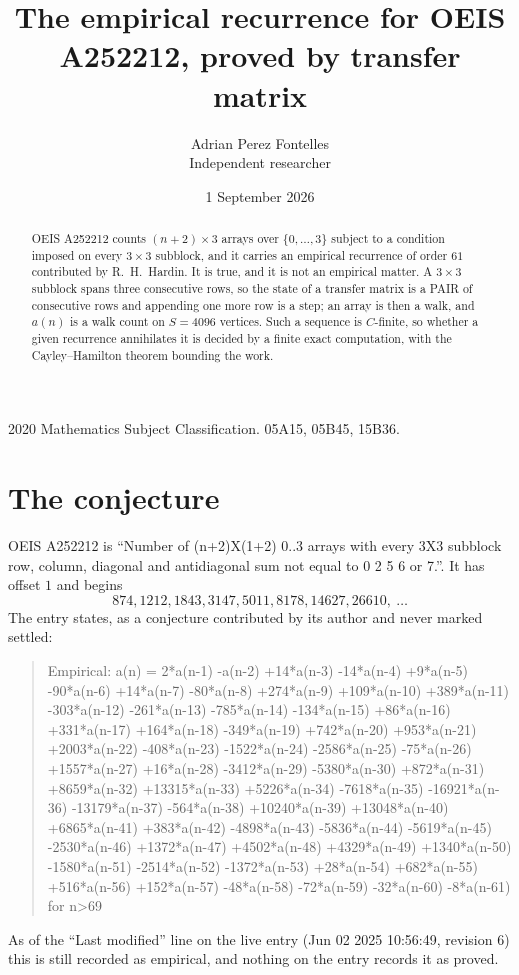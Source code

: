 \documentclass[11pt,a4paper]{article}
\title{The empirical recurrence for OEIS A252212, proved by transfer matrix}
\author{Adrian Perez Fontelles\\ \small Independent researcher}
\date{1 September 2026}
\theoremstyle{plain}
\theoremstyle{definition}
\begin{document}
\maketitle

\begin{abstract}
OEIS A252212 counts $(n+2)\times3$ arrays over $\{0,\dots,3\}$ subject to a condition imposed on
every $3\times3$ subblock, and it carries an empirical recurrence of order $61$
contributed by R.~H.~Hardin. It is true, and it is not an empirical matter. A $3\times3$
subblock spans three consecutive rows, so the state of a transfer matrix is a PAIR of
consecutive rows and appending one more row is a step; an array is then a walk, and
$a(n)$ is a walk count on $S=4096$ vertices. Such a sequence is $C$-finite, so whether a given
recurrence annihilates it is decided by a finite exact computation, with the Cayley--Hamilton
theorem bounding the work.
\end{abstract}

\noindent\small 2020 Mathematics Subject Classification. 05A15, 05B45, 15B36.\normalsize

\section{The conjecture}

OEIS A252212 is ``Number of (n+2)X(1+2) 0..3 arrays with every 3X3 subblock row, column, diagonal and antidiagonal sum not equal to 0 2 5 6 or 7.''. It has offset $1$ and begins
\[
874, 1212, 1843, 3147, 5011, 8178, 14627, 26610,\ \dots
\]
The entry states, as a conjecture contributed by its author and never marked settled:
\begin{quote}
Empirical: a(n) = 2*a(n-1) -a(n-2) +14*a(n-3) -14*a(n-4) +9*a(n-5) -90*a(n-6) +14*a(n-7) -80*a(n-8) +274*a(n-9) +109*a(n-10) +389*a(n-11) -303*a(n-12) -261*a(n-13) -785*a(n-14) -134*a(n-15) +86*a(n-16) +331*a(n-17) +164*a(n-18) -349*a(n-19) +742*a(n-20) +953*a(n-21) +2003*a(n-22) -408*a(n-23) -1522*a(n-24) -2586*a(n-25) -75*a(n-26) +1557*a(n-27) +16*a(n-28) -3412*a(n-29) -5380*a(n-30) +872*a(n-31) +8659*a(n-32) +13315*a(n-33) +5226*a(n-34) -7618*a(n-35) -16921*a(n-36) -13179*a(n-37) -564*a(n-38) +10240*a(n-39) +13048*a(n-40) +6865*a(n-41) +383*a(n-42) -4898*a(n-43) -5836*a(n-44) -5619*a(n-45) -2530*a(n-46) +1372*a(n-47) +4502*a(n-48) +4329*a(n-49) +1340*a(n-50) -1580*a(n-51) -2514*a(n-52) -1372*a(n-53) +28*a(n-54) +682*a(n-55) +516*a(n-56) +152*a(n-57) -48*a(n-58) -72*a(n-59) -32*a(n-60) -8*a(n-61) for n>69
\end{quote}
As of the ``Last modified'' line on the live entry (Jun 02 2025 10:56:49, revision 6) this is still
recorded as empirical, and nothing on the entry records it as proved.
\end{document}
